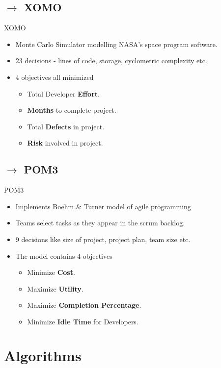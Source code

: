 \documentclass[10pt]{beamer}
\begin{document}
\subsection{$\rightarrow$ XOMO}
\begin{frame}{XOMO}
\begin{itemize}
\item<1-> Monte Carlo Simulator modelling NASA's space program software.
\item<2-> 23 decisions - lines of code, storage, cyclometric complexity etc.
\item<3-> 4 objectives all minimized
    \begin{itemize}
    \item<3-> Total Developer \textbf{Effort}.
    \item<3-> \textbf{Months} to complete project.
    \item<3-> Total \textbf{Defects} in project.
    \item<3-> \textbf{Risk} involved in project.
    \end{itemize}
\end{itemize}
\end{frame}
\subsection{$\rightarrow$ POM3}
\begin{frame}{POM3}
\begin{itemize}
\item<1-> Implements Boehm \& Turner model of agile programming 
\item<2-> Teams select tasks as they appear in the scrum backlog.
\item<3-> 9 decisions like size of project, project plan, team size etc.
\item<4-> The model contains 4 objectives
    \begin{itemize}
    \item<4-> Minimize \textbf{Cost}.
    \item<4-> Maximize \textbf{Utility}.
    \item<4-> Maximize \textbf{Completion Percentage}.
    \item<4-> Minimize \textbf{Idle Time} for Developers.
    \end{itemize}
\end{itemize}
\end{frame}

\section{Algorithms}
\end{document}
